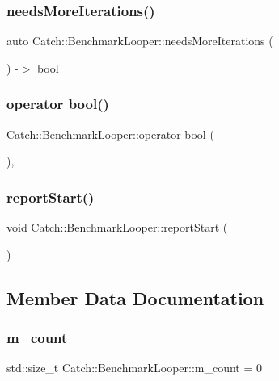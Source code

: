 \subsubsection{needsMoreIterations()}
{\footnotesize\ttfamily auto Catch\+::\+Benchmark\+Looper\+::needs\+More\+Iterations (\begin{DoxyParamCaption}{ }\end{DoxyParamCaption}) -\/$>$  bool}

\mbox{\label{class_catch_1_1_benchmark_looper_a54da41bada9da038dc05faf41d746765}} 
\subsubsection{operator bool()}
{\footnotesize\ttfamily Catch\+::\+Benchmark\+Looper\+::operator bool (\begin{DoxyParamCaption}{ }\end{DoxyParamCaption})\hspace{0.3cm}{\ttfamily [inline]}, {\ttfamily [explicit]}}

\mbox{\label{class_catch_1_1_benchmark_looper_a0697d1b266112b110edf2025b82c4e77}} 
\subsubsection{reportStart()}
{\footnotesize\ttfamily void Catch\+::\+Benchmark\+Looper\+::report\+Start (\begin{DoxyParamCaption}{ }\end{DoxyParamCaption})}



\subsection{Member Data Documentation}
\mbox{\label{class_catch_1_1_benchmark_looper_aae36ced9e5b1c884e2b3ac9d04c1c373}} 
\subsubsection{m\_count}
{\footnotesize\ttfamily std\+::size\+\_\+t Catch\+::\+Benchmark\+Looper\+::m\+\_\+count = 0\hspace{0.3cm}{\ttfamily [private]}}

